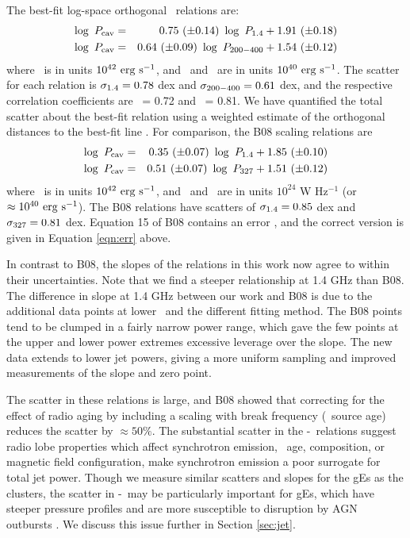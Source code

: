 \documentclass{emulateapj}
\begin{document}
The best-fit log-space orthogonal \bces\ relations are:
\begin{eqnarray}
  \log~P_{\rm{cav}} &=& 0.75~(\pm 0.14)~\log~P_{\rm{1.4}} + 1.91~(\pm 0.18) \label{eqn:high}\\
  \log~P_{\rm{cav}} &=& 0.64~(\pm 0.09)~\log~P_{\rm{200-400}} + 1.54~(\pm 0.12) \label{eqn:low}
\end{eqnarray}
where \pcav\ is in units $10^{42} ~\rm{\mbox{\ensuremath{\rm{erg}}}~\ensuremath{\rm{\mbox{\ensuremath{\rm{s}}}^{-1}}}}$, and \phigh\ and \plow\ are
in units $10^{40} ~\rm{\mbox{\ensuremath{\rm{erg}}}~\ensuremath{\rm{\mbox{\ensuremath{\rm{s}}}^{-1}}}}$. The scatter for each relation is $\sigma_{\rm{1.4}} =
0.78$ dex and $\sigma_{\rm{200-400}} = 0.61$ dex, and the respective correlation
coefficients are \rhigh\ = 0.72 and \rlow\ = 0.81. We have quantified
the total scatter about the best-fit relation using a weighted
estimate of the orthogonal distances to the best-fit line
\citep[see][]{2009A&A...498..361P}. For comparison, the B08 scaling
relations are
\begin{eqnarray}
  \log~P_{\rm{cav}} &=& 0.35~(\pm 0.07)~\log~P_{\rm{1.4}} + 1.85~(\pm 0.10) \\
  \log~P_{\rm{cav}} &=& 0.51~(\pm 0.07)~\log~P_{\rm{327}} + 1.51~(\pm 0.12) \label{eqn:err}
\end{eqnarray}
where \pcav\ is in units $10^{42} ~\rm{\mbox{\ensuremath{\rm{erg}}}~\ensuremath{\rm{\mbox{\ensuremath{\rm{s}}}^{-1}}}}$, and \phigh\ and \pthree\ are
in units $10^{24}$ W Hz$^{-1}$ (or $\approx 10^{40} ~\rm{\mbox{\ensuremath{\rm{erg}}}~\ensuremath{\rm{\mbox{\ensuremath{\rm{s}}}^{-1}}}}$). The B08
relations have scatters of $\sigma_{\rm{1.4}} = 0.85$ dex and $\sigma_{\rm{327}} = 0.81$
dex. Equation 15 of B08 contains an error \citep{birzan08err}, and the
correct version is given in Equation \ref{eqn:err} above.

In contrast to B08, the slopes of the relations in this work now agree
to within their uncertainties. Note that we find a steeper
relationship at 1.4 GHz than B08. The difference in slope at 1.4 GHz
between our work and B08 is due to the additional data points at lower
\pjet\ and the different fitting method. The B08 points tend to be
clumped in a fairly narrow power range, which gave the few points at
the upper and lower power extremes excessive leverage over the
slope. The new data extends to lower jet powers, giving a more uniform
sampling and improved measurements of the slope and zero point.

The scatter in these relations is large, and B08 showed that
correcting for the effect of radio aging by including a scaling with
break frequency (\ie\ source age) reduces the scatter by $\approx
50\%$. The substantial scatter in the \pjet-\prad\ relations suggest
radio lobe properties which affect synchrotron emission, \eg\ age,
composition, or magnetic field configuration, make synchrotron
emission a poor surrogate for total jet power. Though we measure
similar scatters and slopes for the gEs as the clusters, the scatter
in \pjet-\prad\ may be particularly important for gEs, which have
steeper pressure profiles and are more susceptible to disruption by
AGN outbursts \citep{2006MNRAS.372.1161W, 2008ApJ...687L..53P}. We
discuss this issue further in Section \ref{sec:jet}.
\end{document}
